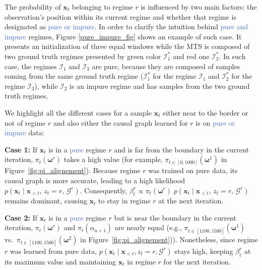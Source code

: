 The probability of $\boldsymbol{x}_t$ belonging to regime $r$ is influenced by two main factors: the observation’s position within its current regime and whether that regime is designated as \textcolor{RoyalBlue}{pure or impure}. In order to clarify the intuition behind \textcolor{RoyalBlue}{pure and impure} regimes, Figure \ref{pure_impure_fig} shows an example of such case. It presents an initialization of three equal windows while the MTS is composed of two ground truth regimes presented by green color $\mathcal{I}_{1}^*$ and red one $\mathcal{I}_{2}^*$. In such case, the regimes $\mathcal{I}_1$ and $\mathcal{I}_3$ are pure, because they are composed of samples coming from the same ground truth regime ($\mathcal{I}_{1}^*$ for the regime $\mathcal{I}_1$ and $\mathcal{I}_{2}^*$ for the regime $\mathcal{I}_3$), while $\mathcal{I}_2$ is an impure regime and has samples from the two ground truth regimes.

We highlight all the different cases for a sample $\boldsymbol{x}_t$ either near to the border or not of regime $r$ and also either the causal graph learned for $r$ is on \textcolor{RoyalBlue}{pure or impure} data:

\textbf{Case 1:}  
If $\boldsymbol{x}_t$ is in a \textcolor{RoyalBlue}{pure} regime $r$ and is far from the boundary in the current iteration, $\pi_t(\boldsymbol{\omega}^r)$ takes a high value (for example, $\pi_{t \in [0,1000]}(\boldsymbol{\omega}^1)$ in Figure~\ref{fig:pi_alignement}). Because regime $r$ was trained on pure data, its causal graph is more accurate, leading to a high likelihood $p(\boldsymbol{x}_t \mid \boldsymbol{x}_{<t},\, z_t = r,\, \mathcal{G}^r)$. Consequently,
$
\beta_t^r \propto \pi_t(\boldsymbol{\omega}^r)\; p(\boldsymbol{x}_t \mid \boldsymbol{x}_{<t},\, z_t = r,\, \mathcal{G}^r)
$
remains dominant, causing $\boldsymbol{x}_t$ to stay in regime $r$ at the next iteration.

\textbf{Case 2:}  
If $\boldsymbol{x}_t$ is in a \textcolor{RoyalBlue}{pure} regime $r$ but is near the boundary in the current iteration, $\pi_t(\boldsymbol{\omega}^r)$ and $\pi_t(\alpha_{u+1})$ are nearly equal (e.g., $\pi_{t \in [1100,1500]}(\boldsymbol{\omega}^1)$ vs.\ $\pi_{t \in [1100,1500]}(\boldsymbol{\omega}^2)$ in Figure~\ref{fig:pi_alignement})). Nonetheless, since regime $r$ was learned from pure data, $p(\boldsymbol{x}_t \mid \boldsymbol{x}_{<t}, z_t = r, \mathcal{G}^r)$ stays high, keeping $\beta_t^r$ at its maximum value and maintaining $\boldsymbol{x}_t$ in regime $r$ for the next iteration.

